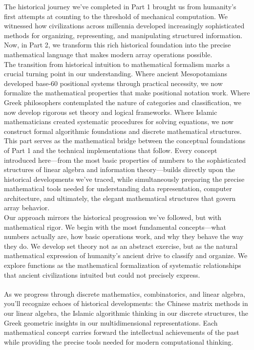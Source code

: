 \documentclass[12pt, oneside, openany]{book}
\begin{document}
The historical journey we've completed in Part 1 brought us from humanity's first attempts at counting to the threshold of mechanical computation. We witnessed how civilizations across millennia developed increasingly sophisticated methods for organizing, representing, and manipulating structured information. Now, in Part 2, we transform this rich historical foundation into the precise mathematical language that makes modern array operations possible.\\
The transition from historical intuition to mathematical formalism marks a crucial turning point in our understanding. Where ancient Mesopotamians developed base-60 positional systems through practical necessity, we now formalize the mathematical properties that make positional notation work. Where Greek philosophers contemplated the nature of categories and classification, we now develop rigorous set theory and logical frameworks. Where Islamic mathematicians created systematic procedures for solving equations, we now construct formal algorithmic foundations and discrete mathematical structures.\\
This part serves as the mathematical bridge between the conceptual foundations of Part 1 and the technical implementations that follow. Every concept introduced here—from the most basic properties of numbers to the sophisticated structures of linear algebra and information theory—builds directly upon the historical developments we've traced, while simultaneously preparing the precise mathematical tools needed for understanding data representation, computer architecture, and ultimately, the elegant mathematical structures that govern array behavior.\\
Our approach mirrors the historical progression we've followed, but with mathematical rigor. We begin with the most fundamental concepts—what numbers actually are, how basic operations work, and why they behave the way they do. We develop set theory not as an abstract exercise, but as the natural mathematical expression of humanity's ancient drive to classify and organize. We explore functions as the mathematical formalization of systematic relationships that ancient civilizations intuited but could not precisely express.\\
\\
As we progress through discrete mathematics, combinatorics, and linear algebra, you'll recognize echoes of historical developments: the Chinese matrix methods in our linear algebra, the Islamic algorithmic thinking in our discrete structures, the Greek geometric insights in our multidimensional representations. Each mathematical concept carries forward the intellectual achievements of the past while providing the precise tools needed for modern computational thinking.\\
\end{document}
